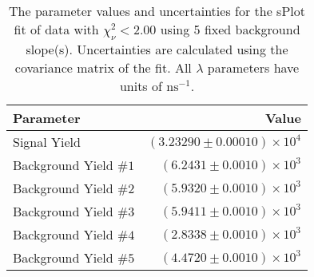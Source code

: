 
\begin{table}
    \begin{center}
        \begin{tabular}{lr}\toprule
            Parameter & Value \\\midrule
            Signal Yield & $(3.23290 \pm 0.00010) \times 10^{4}$ \\
            Background Yield $\#1$ & $(6.2431 \pm 0.0010) \times 10^{3}$ \\
            Background Yield $\#2$ & $(5.9320 \pm 0.0010) \times 10^{3}$ \\
            Background Yield $\#3$ & $(5.9411 \pm 0.0010) \times 10^{3}$ \\
            Background Yield $\#4$ & $(2.8338 \pm 0.0010) \times 10^{3}$ \\
            Background Yield $\#5$ & $(4.4720 \pm 0.0010) \times 10^{3}$ \\\bottomrule
        \end{tabular}
        \caption{The parameter values and uncertainties for the sPlot fit of data with $\chi^2_\nu < 2.00$ using 5 fixed background slope(s). Uncertainties are calculated using the covariance matrix of the fit. All $\lambda$ parameters have units of $\si{\nano\second}^{-1}$.}
    \end{center}
\end{table}
